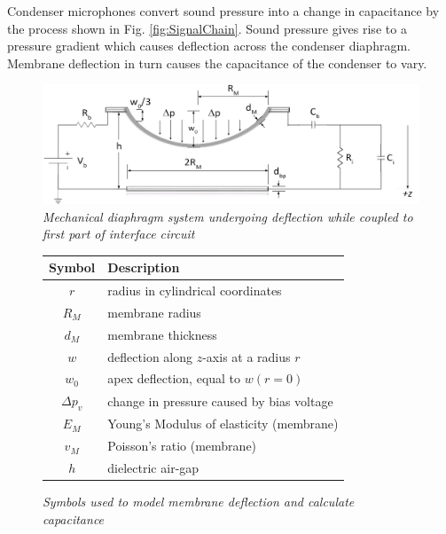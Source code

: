 \documentclass[journal]{IEEEtran}
\begin{document}
Condenser microphones convert sound pressure into a change in capacitance by the process shown in Fig. \ref{fig:SignalChain}. Sound pressure gives rise to a pressure gradient which causes deflection across the condenser diaphragm. Membrane deflection in turn  causes the capacitance of the condenser to vary. %

\begin{figure}[ht]
	\centering
	\includegraphics[scale=0.4]{CouplingCircuit.png}
	\caption{\em Mechanical diaphragm system undergoing deflection while coupled to first part of interface circuit}
	\label{fig:CouplingCircuit}
\end{figure}


\begin{figure}[ht]
	\centering	
	\begin{tabular}{ c | l }
		\hline
		\bf Symbol & \bf Description \\
		\hline
		$r$ & radius in cylindrical coordinates \\
		$R_M$ & membrane radius \\
		$d_M$ & membrane thickness \\
		$w$ & deflection along $z$-axis at a radius $r$ \\
		$w_0$ & apex deflection, equal to $w(r=0)$ \\
		$\Delta p_v$ & change in pressure caused by bias voltage \\
		$E_M$ & Young's Modulus of elasticity (membrane) \\
		$v_M$ & Poisson's ratio (membrane) \\
		$h$ & dielectric air-gap
	\end{tabular}
	
	\caption{\em Symbols used to model membrane deflection and calculate capacitance}
	\label{fig:MembraneDeflection}
\end{figure}
\end{document}

